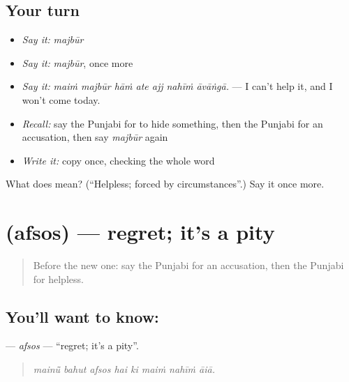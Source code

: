 \subsection*{Your turn}
\begin{itemize}
\raggedright
  \item \emph{Say it:} \emph{majbūr}
  \item \emph{Say it:} \emph{majbūr}, once more
  \item \emph{Say it:} \emph{maiṁ majbūr hāṁ ate ajj nahīṁ āvāṅgā.} — I can't help it, and I won't come today.
  \item \emph{Recall:} say the Punjabi for to hide something, then the Punjabi for an accusation, then say \emph{majbūr} again
  \item \emph{Write it:} copy \textbf{} once, checking the whole word
\end{itemize}

\begin{tcolorbox}[breakable,colback=teal!4,colframe=teal!35!black,title={Before you move on}]
What does  mean? (\textquotedblleft{}Helpless; forced by circumstances\textquotedblright{}.) Say it once more.
\end{tcolorbox}
\section[\texorpdfstring{\pa{ਅਫ਼ਸੋਸ} (afsos)}{ਅਫ਼ਸੋਸ (afsos)}]{ (afsos) — regret; it's a pity}

\label{lesson:PA-C346-afsos}



\begin{quote}
Before the new one: say the Punjabi for an accusation, then the Punjabi for helpless.
\end{quote}

\subsection*{You'll want to know: }
\textbf{} — \emph{afsos} — \textquotedblleft{}regret; it's a pity\textquotedblright{}.

\begin{quote}
       
\end{quote}

\begin{quote}
\emph{mainū̃ bahut afsos hai ki maiṁ nahīṁ āiā.}
\end{quote}


